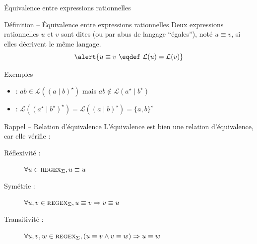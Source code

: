 
\begingroup

\begin{frame}{Équivalence entre expressions rationnelles}

  \begin{block}{Définition -- Équivalence entre expressions rationnelles}
    Deux expressions rationnelles \alert{$u$} et \alert{$v$} sont dites 
    (ou par abus de langage ``égales''), noté \alert{$u \equiv v$},
    si elles décrivent le même langage.
    $$\alert{u \equiv v ~\eqdef~ \mathcal{L}(u) = \mathcal{L}(v)}$$
  \end{block}

  \vspace{-2mm}
  \begin{exampleblock}{Exemples}
    \begin{itemize}
    \item {} : $ab \in \mathcal{L}((a \mid b)^\star)$ mais $ab \not\in \mathcal{L}(a^\star \mid  b^\star)$
    \item {} : $\mathcal{L}((a^\star \mid b^\star)^\star) = \mathcal{L}((a \mid b)^\star) = \{a, b\}^\star$
    \end{itemize}
  \end{exampleblock}

  \begin{block}{Rappel -- Relation d'équivalence}
    L'équivalence est bien une relation d'équivalence, car elle vérifie :
    \begin{description}
    \item[Réflexivité :] $\forall u\in\textsc{regex}_\Sigma, u\equiv u$
    \item[Symétrie :]    $\forall u, v\in\textsc{regex}_\Sigma, u\equiv v \Rightarrow v\equiv u$
    \item[Transitivité :]$\forall u, v, w\in\textsc{regex}_\Sigma, (u\equiv v \land v \equiv w) \Rightarrow u\equiv w$
    \end{description}
  \end{block}
  
\end{frame}

\endgroup
\endinput

